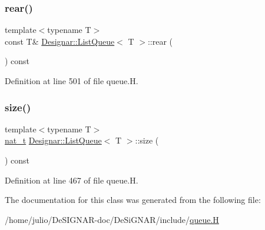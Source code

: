 \subsubsection{\texorpdfstring{rear()}{rear()}\hspace{0.1cm}{\footnotesize\ttfamily [2/2]}}
{\footnotesize\ttfamily template$<$typename T$>$ \\
const T\& \hyperlink{class_designar_1_1_list_queue}{Designar\+::\+List\+Queue}$<$ T $>$\+::rear (\begin{DoxyParamCaption}{ }\end{DoxyParamCaption}) const\hspace{0.3cm}{\ttfamily [inline]}}



Definition at line 501 of file queue.\+H.

\mbox{\label{class_designar_1_1_list_queue_a0a2d3a25c27b0529b1bcc4b0c0b27855}} 
\subsubsection{\texorpdfstring{size()}{size()}}
{\footnotesize\ttfamily template$<$typename T$>$ \\
\hyperlink{namespace_designar_aa72662848b9f4815e7bf31a7cf3e33d1}{nat\+\_\+t} \hyperlink{class_designar_1_1_list_queue}{Designar\+::\+List\+Queue}$<$ T $>$\+::size (\begin{DoxyParamCaption}{ }\end{DoxyParamCaption}) const\hspace{0.3cm}{\ttfamily [inline]}}



Definition at line 467 of file queue.\+H.



The documentation for this class was generated from the following file\+:\begin{DoxyCompactItemize}
\item 
/home/julio/\+De\+S\+I\+G\+N\+A\+R-\/doc/\+De\+Si\+G\+N\+A\+R/include/\hyperlink{queue_8_h}{queue.\+H}\end{DoxyCompactItemize}
